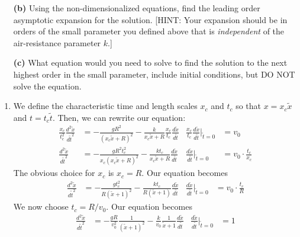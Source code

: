 \documentclass[10pt,letterpaper]{report}
\begin{document}
\begin{enumerate}
\begin{qbox}
\begin{itemize}
    \item[\textbf{(b)}] Using the non-dimensionalized equations, find the leading order asymptotic expansion for the solution. [HINT: Your expansion should be in orders of the small parameter you defined above that is \textit{independent} of the air-resistance parameter $k$.]
    
    \item[\textbf{(c)}] What equation would you need to solve to find the solution to the next highest order in the small parameter, include initial conditions, but DO NOT solve the equation.
\end{itemize}
\end{qbox}

\begin{enumerate}
    \item We define the characteristic time and length scales $x_c$ and $t_c$ so that $x = x_c\widetilde{x}$ and $t = t_c \widetilde{t}$. Then, we can rewrite our equation:
    \begin{align*}
        \frac{x_c}{t_c^2}\frac{d^2\widetilde x}{d\widetilde t^2} &= -\frac{gR^2}{(x_c\widetilde x + R)^2} - \frac{k}{x_c\widetilde x + R}\frac{x_c}{t_c}\frac{d\widetilde x}{d\widetilde t} 
        & 
        \frac{x_c}{t_c}\frac{d\widetilde x}{d\widetilde t}\bigg\vert_{\widetilde t = 0} &= v_0
        \\
        \frac{d^2\widetilde x}{d\widetilde t^2} &= -\frac{gR^2t_c^2}{x_c(x_c\widetilde x + R)^2} - \frac{kt_c}{x_c\widetilde x + R}\frac{d\widetilde x}{d\widetilde t} 
        &
        \frac{d\widetilde x}{d\widetilde t}\bigg\vert_{\widetilde t = 0} &= v_0\cdot \frac{t_c}{x_c}
    \end{align*}
    The obvious choice for $x_c$ is $x_c = R$. Our equation becomes
    \begin{align*}
        \frac{d^2\widetilde x}{d\widetilde t^2} &= -\frac{gt_c^2}{R(\widetilde x + 1)^2} - \frac{kt_c}{R\left(\widetilde x + 1\right)}\frac{d\widetilde x}{d\widetilde t} 
        &
        \frac{d\widetilde x}{d\widetilde t}\bigg\vert_{\widetilde t = 0} &= v_0\cdot \frac{t_c}{R}
    \end{align*}
    We now choose $t_c = R/v_0$. Our equation becomes
    \begin{align*}
        \frac{d^2\widetilde x}{d\widetilde t^2} &= -\frac{gR}{v_0^2}\frac{1}{(\widetilde x + 1)^2} - \frac{k}{v_0}\frac{1}{\widetilde x + 1}\frac{d\widetilde x}{d\widetilde t} 
        &
        \frac{d\widetilde x}{d\widetilde t}\bigg\vert_{\widetilde t = 0} &= 1
        \\

\end{align*}
\end{enumerate}
\end{enumerate}
\end{document}
